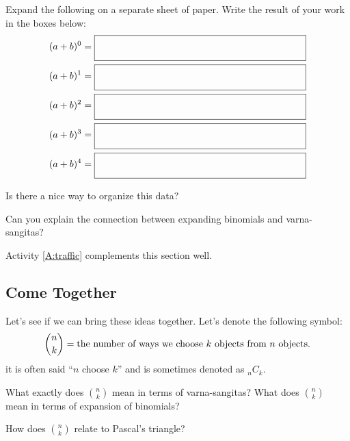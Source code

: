 Expand the following on a separate sheet of paper. Write the result
of your work in the boxes below:
\begin{align*}
(a + b)^0 &=  \raisebox{-3mm}{\fbox{\rule[0mm]{0mm}{7mm}\hspace{50ex}}} \\
(a + b)^1 &=  \raisebox{-3mm}{\fbox{\rule[0mm]{0mm}{7mm}\hspace{50ex}}} \\
(a + b)^2 &=  \raisebox{-3mm}{\fbox{\rule[0mm]{0mm}{7mm}\hspace{50ex}}} \\
(a + b)^3 &=  \raisebox{-3mm}{\fbox{\rule[0mm]{0mm}{7mm}\hspace{50ex}}} \\
(a + b)^4 &=  \raisebox{-3mm}{\fbox{\rule[0mm]{0mm}{7mm}\hspace{50ex}}} 
\end{align*}

\begin{question} Is there a nice way to organize this data?
\end{question}
\QM

\begin{question}
Can you explain the connection between expanding binomials and
varna-sangitas?
\end{question}
\QM

\begin{activitynote}
Activity \ref{A:traffic} complements this section well.  %
\end{activitynote}



\subsection{Come Together}

Let's see if we can bring these ideas together. Let's denote the following symbol:
\[
\binom{n}{k} = \text{the number of ways we choose $k$ objects from $n$
  objects}.\index{nchoosek@$\binom{n}{k}$}\index{nck@$_nC_k$}
\]
it is often said ``$n$ choose $k$'' and is sometimes denoted as $_n C_k$.

\begin{question}
What exactly does $\binom{n}{k}$ mean in terms of varna-sangitas? What
does $\binom{n}{k}$ mean in terms of expansion of binomials?
\end{question}
\QM

\begin{question} How does $\binom{n}{k}$ relate to Pascal's triangle?
\end{question}
\QM


